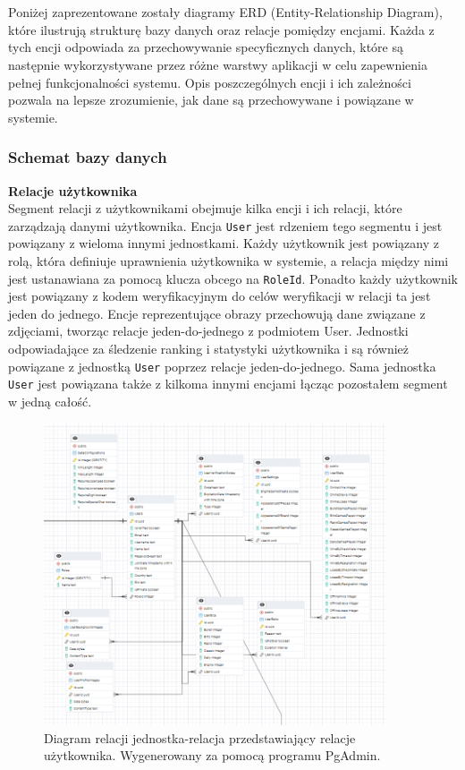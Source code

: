 \documentclass[12pt,a4paper]{article}
\begin{document}
\\\\
Poniżej zaprezentowane zostały diagramy ERD (Entity-Relationship Diagram), które ilustrują strukturę bazy danych oraz relacje pomiędzy encjami. Każda z tych encji odpowiada za przechowywanie specyficznych danych, które są następnie wykorzystywane przez różne warstwy aplikacji w celu zapewnienia pełnej funkcjonalności systemu. Opis poszczególnych encji i ich zależności pozwala na lepsze zrozumienie, jak dane są przechowywane i powiązane w systemie.

\newpage

\subsubsection{Schemat bazy danych}

\noindent \textbf{Relacje użytkownika}\\
Segment relacji z użytkownikami obejmuje kilka encji i ich relacji, które zarządzają danymi użytkownika. Encja \texttt{User} jest rdzeniem tego segmentu i jest powiązany z wieloma innymi jednostkami. Każdy użytkownik jest powiązany z rolą, która definiuje uprawnienia użytkownika w systemie, a relacja między nimi jest ustanawiana za pomocą klucza obcego na \texttt{RoleId}. Ponadto każdy użytkownik jest powiązany z kodem weryfikacyjnym do celów weryfikacji w relacji ta jest jeden do jednego. Encje reprezentujące obrazy przechowują dane związane z zdjęciami, tworząc relacje jeden-do-jednego z podmiotem User. Jednostki odpowiadające za śledzenie ranking i statystyki użytkownika i są również powiązane z jednostką \texttt{User} poprzez relacje jeden-do-jednego. Sama jednostka \texttt{User} jest powiązana także z kilkoma innymi encjami łącząc pozostałem segment w jedną całość.

\vspace{0.5cm}
\begin{figure}[h!]
    \centering
    \includegraphics[width=0.9\textwidth]{images/ERD_user.png}
    \caption{Diagram relacji jednostka-relacja przedstawiający relacje użytkownika. Wygenerowany za pomocą programu PgAdmin.}
\end{figure}
\end{document}
